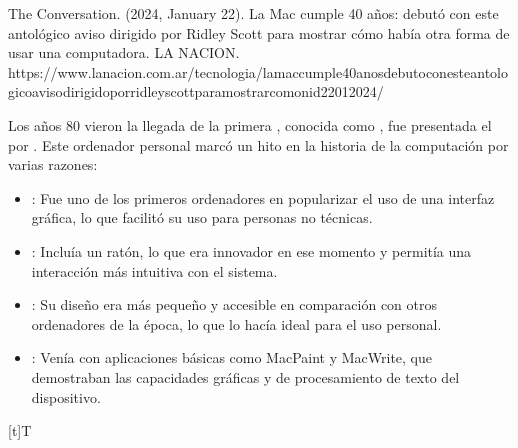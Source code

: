 \documentclass[letterpaper,10pt,spanish]{sphinxmanual}
\let\sphinxpxdimen\pdfpxdimen\else\newdimen\sphinxpxdimen
\begin{document}
\sphinxAtStartPar
%
\begin{footnote}[7]\sphinxAtStartFootnote
The Conversation. (2024, January 22). La Mac cumple 40 años: debutó con este antológico aviso dirigido por Ridley Scott para mostrar cómo había otra forma de usar una computadora. LA NACION. https://www.lanacion.com.ar/tecnologia/la\sphinxhyphen{}mac\sphinxhyphen{}cumple\sphinxhyphen{}40\sphinxhyphen{}anos\sphinxhyphen{}debuto\sphinxhyphen{}con\sphinxhyphen{}este\sphinxhyphen{}antologico\sphinxhyphen{}aviso\sphinxhyphen{}dirigido\sphinxhyphen{}por\sphinxhyphen{}ridley\sphinxhyphen{}scott\sphinxhyphen{}para\sphinxhyphen{}mostrar\sphinxhyphen{}como\sphinxhyphen{}nid22012024/
%
\end{footnote} Los años 80 vieron la llegada de la primera , conocida como , fue presentada el  por . Este ordenador personal marcó un hito en la historia de la computación por varias razones:
\begin{itemize}
\item {} 
\sphinxAtStartPar
{}: Fue uno de los primeros ordenadores en popularizar el uso de una interfaz gráfica, lo que facilitó su uso para personas no técnicas.

\item {} 
\sphinxAtStartPar
{}: Incluía un ratón, lo que era innovador en ese momento y permitía una interacción más intuitiva con el sistema.

\item {} 
\sphinxAtStartPar
{}: Su diseño era más pequeño y accesible en comparación con otros ordenadores de la época, lo que lo hacía ideal para el uso personal.

\item {} 
\sphinxAtStartPar
{}: Venía con aplicaciones básicas como MacPaint y MacWrite, que demostraban las capacidades gráficas y de procesamiento de texto del dispositivo.

\end{itemize}


\begin{savenotes}\sphinxattablestart
\sphinxthistablewithglobalstyle
\centering
\begin{tabulary}{\linewidth}[t]{T}
\sphinxtoprule
\sphinxtableatstartofbodyhook

\begin{sphinxfigure-in-table}
\centering
\capstart
\noindent\sphinxincludegraphics[width=600\sphinxpxdimen]{{image05}.png}
\label{\detokenize{cursos/informatica10/recursos/T01:id30}}\end{sphinxfigure-in-table}\relax
\\
\sphinxbottomrule
\end{tabulary}
\sphinxtableafterendhook\par
\sphinxattableend\end{savenotes}
\end{document}
